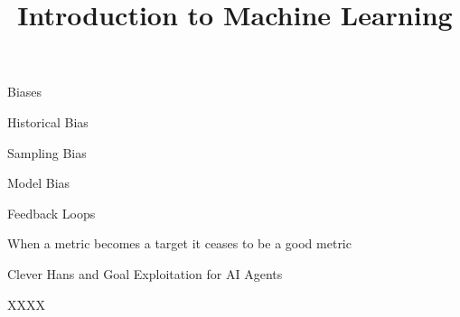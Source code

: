 


\newcommand{\learninggoals}{
\item XXXX
}


\title{Introduction to Machine Learning}
\date{}



\begin{vbframe}{Biases}


\end{vbframe}
\begin{vbframe}{Historical Bias}


\end{vbframe}

\begin{vbframe}{Sampling Bias}


\end{vbframe}

\begin{vbframe}{Model Bias}


\end{vbframe}

\begin{vbframe}{Feedback Loops}


\end{vbframe}

\begin{vbframe}{When a metric becomes a target it ceases to be a good metric}


\end{vbframe}

\begin{vbframe}{Clever Hans and Goal Exploitation for AI Agents}


\end{vbframe}




\begin{vbframe}{XXXX}


\end{vbframe}


\endlecture


